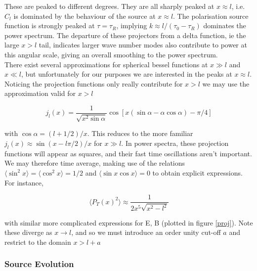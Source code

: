 \documentclass[a4paper,10pt]{article}
\begin{document}
These are peaked to different degrees. They are all sharply peaked at $x\approx l$, i.e. $C_l$ is dominated by the behaviour of the source at $x\approx l$. The polarisation source function is strongly peaked at $\tau=\tau_R$, implying $k\approx l/(\tau_0-\tau_R)$ dominates the power spectrum. The departure of these projectors from a delta function, ie the large $x>l$ tail, indicates larger wave number modes also contribute to power at this angular scale, giving an overall smoothing to the power spectrum.\\

There exist several approximations for spherical bessel functions at $x\gg l$ and $x\ll l$, but unfortunately for our purposes we are interested in the peaks at $x\approx l$. Noticing the projection functions only really contribute for $x>l$ we may use the approximation valid for $x>l$

\begin{equation}
j_l(x) = \frac{1}{\sqrt{x^2\sin\alpha}}\cos[x(\sin\alpha-\alpha\cos\alpha)-\pi/4]
\end{equation}

with $\cos\alpha=(l+1/2)/x$. This reduces to the more familiar $j_l(x) \approx \sin(x-l\pi/2)/x$ for $x\gg l$. In power spectra, these projection functions will appear as squares, and their fast time oscillations aren't important. We may therefore time average, making use of the relations $\langle \sin^2x \rangle = \langle \cos^2x \rangle = 1/2$ and $\langle \sin x\cos x \rangle = 0$ to obtain explicit expressions. For instance,

\begin{equation}
\langle P_T(x)^2 \rangle \approx \frac{1}{2x^5\sqrt{x^2-l^2}}
\end{equation}

with similar more complicated expressions for E, B (plotted in figure \ref{proj}). Note these diverge as $x\rightarrow l$, and so we must introduce an order unity cut-off $a$ and restrict to the domain $x>l+a$





\subsubsection{Source Evolution}
\end{document}
